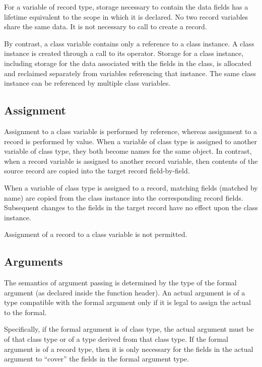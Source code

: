 For a variable of record type, storage necessary to contain the data fields
has a lifetime equivalent to the scope in which it is declared.  No two record
variables share the same data.  It is not necessary to call  to create
a record.

By contrast, a class variable contains only a reference to a
class instance.  A class instance is created through a call to its 
operator.  Storage for a class instance, including storage for
the data associated with the fields in the class, is allocated and reclaimed
separately from variables referencing that instance.  The same class instance
can be referenced by multiple class variables.

\subsection{Assignment}
\label{Assignment_Differences}

Assignment to a class variable is performed by reference, whereas assignment to
a record is performed by value.  When a variable of class type is assigned to
another variable of class type, they both become names for the same object.  In
contrast, when a record variable is assigned to another record variable, then
contents of the source record are copied into the target record field-by-field.

When a variable of class type is assigned to a record, matching fields (matched
by name) are copied from the class instance into the corresponding record
fields.  Subsequent changes to the fields in the target record have no effect
upon the class instance.

Assignment of a record to a class variable is not permitted.

\subsection{Arguments}
\label{Argument_Differences}

The semantics of argument passing is determined by the type of the formal
argument (as declared inside the function header).  An actual argument is of a
type compatible with the formal argument only if it is legal to assign the
actual to the formal.

Specifically, if the formal argument is of class type, the actual argument must
be of that class type or of a type derived from that class type.  If the formal
argument is of a record type, then it is only necessary for the fields in the
actual argument to ``cover'' the fields in the formal argument type.

